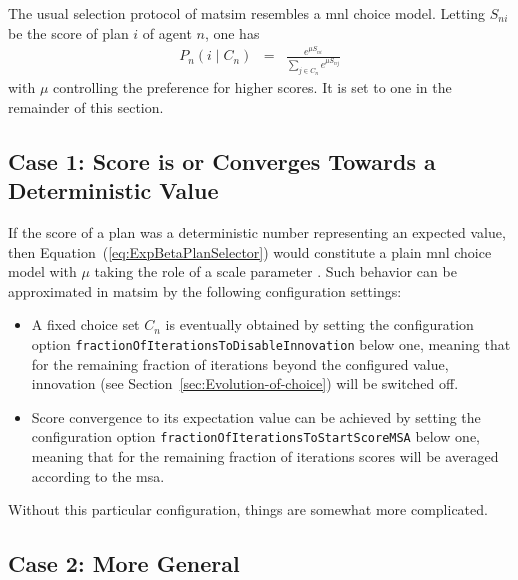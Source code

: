 The usual selection protocol of \gls{matsim} resembles a \gls{mnl}
choice model. Letting $S_{ni}$ be the score of plan $i$ of agent
$n$, one has
\begin{eqnarray}
P_{n}(i\mid C_{n}) & = & \frac{e^{\mu S_{ni}}}{\sum_{j\in C_{n}}e^{\mu S_{nj}}}\label{eq:ExpBetaPlanSelector}
\end{eqnarray}
with $\mu$ controlling the preference for higher scores.
It is set to one in the remainder of this section. 

\subsection{Case 1: Score is or Converges Towards a Deterministic Value}
\label{sec:score-is-converged}

If the score
of a plan was a deterministic number representing an expected value, 
then Equation~(\ref{eq:ExpBetaPlanSelector}) would constitute a plain \gls{mnl} choice model with $\mu$ taking the role
of a scale parameter \citep[see, e.g.,][p.45]{Train_2003}. 
Such behavior 
can be approximated in \acrshort{matsim} by the following configuration settings:
\begin{itemize}
\styleItemize
\item A fixed choice set $C_n$ is eventually obtained by setting the configuration option \verb$fractionOfIterationsToDisableInnovation$ below one,  
meaning that for the remaining fraction of iterations beyond the configured value, innovation (see Section~\ref{sec:Evolution-of-choice}) will be switched off.
\item Score convergence to its expectation value can be achieved by setting the configuration option \verb$fractionOfIterationsToStartScoreMSA$ below one, 
meaning that for the remaining fraction of iterations scores will be averaged according to the \acrfull{msa}.
\end{itemize}
%

Without this particular configuration, things are somewhat more complicated.


\subsection{Case 2: More General}
\label{sec:more-general-choice}

